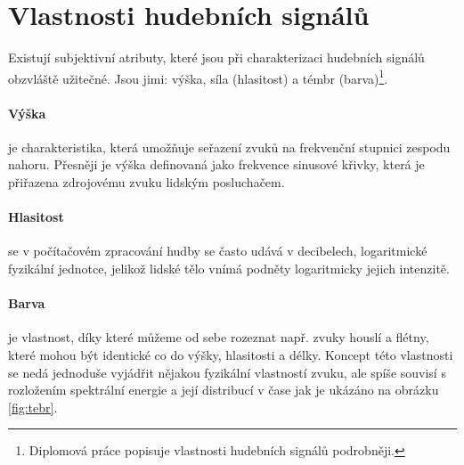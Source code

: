 \documentclass[thesis=B, czech]{FITthesis}[2019/03/06]
\begin{document}



\newpage

\section{Vlastnosti hudebních signálů}

Existují subjektivní atributy, které jsou při charakterizaci hudebních signálů obzvláště užitečné. Jsou jimi: výška, síla (hlasitost) a témbr (barva)\footnote{Diplomová práce \cite{Holcik2009} popisuje vlastnosti hudebních signálů podrobněji.}.

\paragraph{Výška}

 je charakteristika, která umožňuje seřazení zvuků na frekvenční stupnici zespodu nahoru. Přesněji je výška definovaná jako frekvence sinusové křivky, která je přiřazena zdrojovému zvuku lidským posluchačem.

\paragraph{Hlasitost}

 se v počítačovém zpracování hudby se často udává v decibelech, logaritmické fyzikální jednotce, jelikož lidské tělo vnímá podněty logaritmicky jejich intenzitě.

\paragraph{Barva} \label{tebr}

 je vlastnost, díky které můžeme od sebe rozeznat např. zvuky houslí a flétny, které mohou být identické co do výšky, hlasitosti a délky. Koncept této vlastnosti se nedá jednoduše vyjádřit nějakou fyzikální vlastností zvuku, ale spíše souvisí s rozložením spektrální energie a její distribucí v čase jak je ukázáno na obrázku \ref{fig:tebr}.
 
\end{document}
